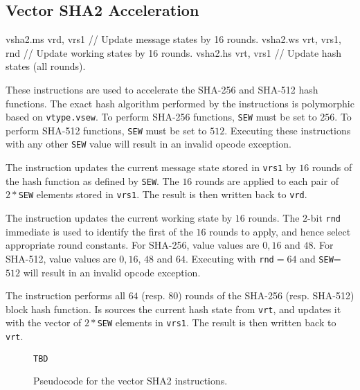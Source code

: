 
\subsection{Vector SHA2 Acceleration}
\label{sec:vector:sha2}

\begin{cryptoisa}
vsha2.ms vrd, vrs1      // Update message states by 16 rounds.
vsha2.ws vrt, vrs1, rnd // Update working states by 16 rounds.
vsha2.hs vrt, vrs1      // Update hash states (all rounds).
\end{cryptoisa}

These instructions are used to accelerate the SHA-256 and SHA-512
hash functions.
The exact hash algorithm performed by the instructions is
polymorphic based on {\tt vtype.vsew}.
To perform SHA-256 functions, {\tt SEW} must be set to $256$.
To perform SHA-512 functions, {\tt SEW} must be set to $512$.
Executing these instructions with any other {\tt SEW} value will
result in an invalid opcode exception.

The  instruction updates the current message
state stored in {\tt vrs1} by $16$ rounds of the hash function
as defined by {\tt SEW}.
The $16$ rounds are applied to each pair of $2*${\tt SEW}
elements stored in {\tt vrs1}.
The result is then written back to {\tt vrd}.

The  instruction updates the current working state
by $16$ rounds.
The $2$-bit {\tt rnd} immediate is used to identify the first of
the $16$ rounds to apply, and hence select appropriate round constants.
For SHA-256, value values are $0, 16$       and $48$.
For SHA-512, value values are $0, 16$, $48$ and $64$.
Executing  with {\tt rnd}$=64$ and {\tt SEW}=$512$
will result in an invalid opcode exception.

The  instruction performs all
$64$ (resp. $80$) rounds of the SHA-256 (resp. SHA-512) block hash function.
Is sources the current hash state from {\tt vrt}, and
updates it with the vector of $2*${\tt SEW} elements in {\tt vrs1}.
The result is then written back to {\tt vrt}.


\begin{figure}[h]
\begin{lstlisting}[language=pseudo]
TBD
\end{lstlisting}
\caption{Pseudocode for the vector SHA2 instructions.}
\label{fig:pseudo:sha:vector}
\end{figure}
